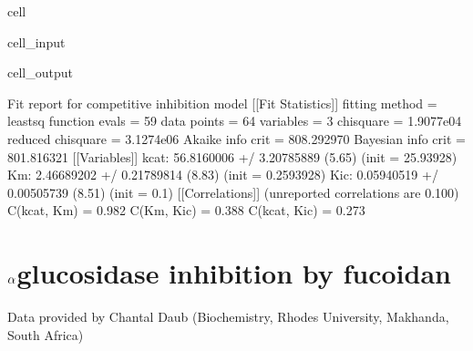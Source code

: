 \documentclass[letterpaper,10pt,english]{jupyterBook}
\begin{document}
\begin{sphinxuseclass}{cell}\begin{sphinxVerbatimInput}

\begin{sphinxuseclass}{cell_input}
\begin{sphinxVerbatim}[commandchars=\\\{\}]
\end{sphinxVerbatim}

\end{sphinxuseclass}\end{sphinxVerbatimInput}
\begin{sphinxVerbatimOutput}

\begin{sphinxuseclass}{cell_output}
\begin{sphinxVerbatim}[commandchars=\\\{\}]
Fit report for competitive inhibition model
[[Fit Statistics]]
    \PYGZsh{} fitting method   = leastsq
    \PYGZsh{} function evals   = 59
    \PYGZsh{} data points      = 64
    \PYGZsh{} variables        = 3
    chi\PYGZhy{}square         = 1.9077e\PYGZhy{}04
    reduced chi\PYGZhy{}square = 3.1274e\PYGZhy{}06
    Akaike info crit   = \PYGZhy{}808.292970
    Bayesian info crit = \PYGZhy{}801.816321
[[Variables]]
    k\PYGZus{}cat:  56.8160006 +/\PYGZhy{} 3.20785889 (5.65\PYGZpc{}) (init = 25.93928)
    Km:     2.46689202 +/\PYGZhy{} 0.21789814 (8.83\PYGZpc{}) (init = 0.2593928)
    K\PYGZus{}ic:   0.05940519 +/\PYGZhy{} 0.00505739 (8.51\PYGZpc{}) (init = 0.1)
[[Correlations]] (unreported correlations are \PYGZlt{} 0.100)
    C(k\PYGZus{}cat, Km)   = 0.982
    C(Km, K\PYGZus{}ic)    = 0.388
    C(k\PYGZus{}cat, K\PYGZus{}ic) = 0.273
\end{sphinxVerbatim}

\noindent{}

\end{sphinxuseclass}\end{sphinxVerbatimOutput}

\end{sphinxuseclass}
\sphinxstepscope


\section{\protect\(\alpha\protect\)\sphinxhyphen{}glucosidase inhibition by fucoidan}
\label{\detokenize{scenarios/glycosidase_inhibition:scenario-b-br-alpha-glucosidase-inhibition-by-fucoidan}}\label{\detokenize{scenarios/glycosidase_inhibition::doc}}
\sphinxAtStartPar
Data provided by Chantal Daub (Biochemistry, Rhodes University, Makhanda, South Africa)
\end{document}
